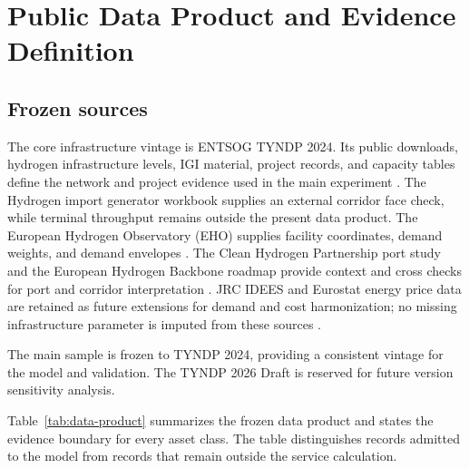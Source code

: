 \documentclass{ieeeaccess}
\begin{document}
\section{Public Data Product and Evidence Definition}
\label{sec:data}

\subsection{Frozen sources}

The core infrastructure vintage is ENTSOG TYNDP 2024. Its public downloads, hydrogen infrastructure levels, IGI material, project records, and capacity tables define the network and project evidence used in the main experiment \cite{ENTSOGDownloads,ENTSOGInfraLevels,ENTSOGIGI,ENTSOGAnnexA,ENTSOGAnnexC2,ENTSOGHydrogenInputs}. The Hydrogen import generator workbook supplies an external corridor face check, while terminal throughput remains outside the present data product. The European Hydrogen Observatory (EHO) supplies facility coordinates, demand weights, and demand envelopes \cite{EHOdemand,EHOfuture}. The Clean Hydrogen Partnership port study and the European Hydrogen Backbone roadmap provide context and cross checks for port and corridor interpretation \cite{CHPPorts,EHB}. JRC IDEES and Eurostat energy price data are retained as future extensions for demand and cost harmonization; no missing infrastructure parameter is imputed from these sources \cite{JRCIDEES,EurostatEnergy}.

The main sample is frozen to TYNDP 2024, providing a consistent vintage for the model and validation. The TYNDP 2026 Draft is reserved for future version sensitivity analysis.

Table~\ref{tab:data-product} summarizes the frozen data product and states the evidence boundary for every asset class. The table distinguishes records admitted to the model from records that remain outside the service calculation.
\end{document}
